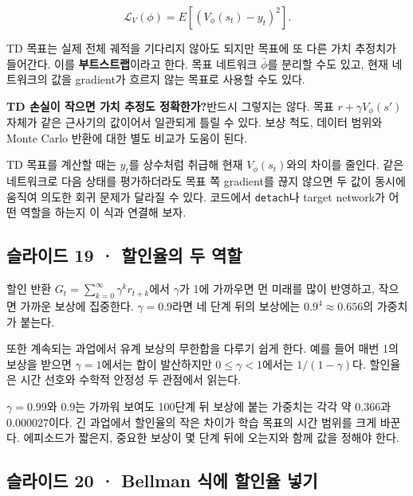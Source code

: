 \documentclass[11pt,a4paper]{article}
\begin{document}
\[
\mathcal L_V(\phi)
=E\!\left[(V_\phi(s_t)-y_t)^2\right].
\]

TD 목표는 실제 전체 궤적을 기다리지 않아도 되지만 목표에 또 다른 가치 추정치가 들어간다. 이를 \textbf{부트스트랩}이라고 한다. 목표 네트워크 $\bar\phi$를 분리할 수도 있고, 현재 네트워크의 값을 gradient가 흐르지 않는 목표로 사용할 수도 있다.\par

\par\medskip\noindent\textbf{TD 손실이 작으면 가치 추정도 정확한가?}\quad 반드시 그렇지는 않다. 목표 $r+\gamma V_\phi(s')$ 자체가 같은 근사기의 값이어서 일관되게 틀릴 수 있다. 보상 척도, 데이터 범위와 Monte Carlo 반환에 대한 별도 비교가 도움이 된다.\par

TD 목표를 계산할 때는 $y_t$를 상수처럼 취급해 현재 $V_\phi(s_t)$와의 차이를 줄인다. 같은 네트워크로 다음 상태를 평가하더라도 목표 쪽 gradient를 끊지 않으면 두 값이 동시에 움직여 의도한 회귀 문제가 달라질 수 있다. 코드에서 \texttt{detach}나 target network가 어떤 역할을 하는지 이 식과 연결해 보자.\par

\subsection{슬라이드 19 · 할인율의 두 역할}

할인 반환 $G_t=\sum_{k=0}^{\infty}\gamma^k r_{t+k}$에서 $\gamma$가 1에 가까우면 먼 미래를 많이 반영하고, 작으면 가까운 보상에 집중한다. $\gamma=0.9$라면 네 단계 뒤의 보상에는 $0.9^4\approx0.656$의 가중치가 붙는다.\par

또한 계속되는 과업에서 유계 보상의 무한합을 다루기 쉽게 한다. 예를 들어 매번 1의 보상을 받으면 $\gamma=1$에서는 합이 발산하지만 $0\le\gamma<1$에서는 $1/(1-\gamma)$다. 할인율은 시간 선호와 수학적 안정성 두 관점에서 읽는다.\par

$\gamma=0.99$와 $0.9$는 가까워 보여도 100단계 뒤 보상에 붙는 가중치는 각각 약 $0.366$과 $0.000027$이다. 긴 과업에서 할인율의 작은 차이가 학습 목표의 시간 범위를 크게 바꾼다. 에피소드가 짧은지, 중요한 보상이 몇 단계 뒤에 오는지와 함께 값을 정해야 한다.\par

\subsection{슬라이드 20 · Bellman 식에 할인율 넣기}
\end{document}
